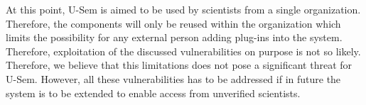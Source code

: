 At this point, U-Sem is aimed to be used by scientists from a single organization. Therefore, the components will only be reused within the organization which limits the possibility for any external person adding plug-ins into the system. Therefore, exploitation of the discussed vulnerabilities on purpose is not so likely. Therefore, we believe that this limitations does not pose a significant threat for U-Sem. However, all these vulnerabilities has to be addressed if in future the system is to be extended to enable access from unverified scientists. 
